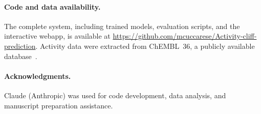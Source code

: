 \documentclass[sigconf, nonacm]{acmart}
\begin{document}
\paragraph{Code and data availability.} The complete system, including trained models, evaluation scripts, and the interactive webapp, is available at \url{https://github.com/mcuccarese/Activity-cliff-prediction}. Activity data were extracted from ChEMBL~36, a publicly available database~\cite{Zdrazil2024}.

\paragraph{Acknowledgments.} Claude (Anthropic) was used for code development, data analysis, and manuscript preparation assistance.


\end{document}
